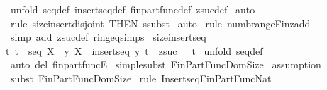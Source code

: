 \begin{isabellebody}
%
\isadelimproof
%
\endisadelimproof
%
\isatagproof
{}\isamarkupfalse%
\ {\isacharparenleft}unfold\ seq{\isacharunderscore}def\ insertseq{\isacharunderscore}def\ fin{\isacharunderscore}part{\isacharunderscore}func{\isacharunderscore}def\ zsuc{\isacharunderscore}def{\isacharparenright}\isanewline
{}\isamarkupfalse%
\ auto\isanewline
{}\isamarkupfalse%
\ {\isacharparenleft}rule\ size{\isacharunderscore}insert{\isacharunderscore}disjoint\ {\isacharbrackleft}THEN\ ssubst{\isacharbrackright}{\isacharparenright}\isanewline
{}\isamarkupfalse%
\ auto\isanewline
{}\isamarkupfalse%
\ {\isacharparenleft}rule\ numb{\isacharunderscore}range{\isacharunderscore}Fin{\isacharunderscore}zadd{\isacharparenright}\isanewline
{}\isamarkupfalse%
\ {\isacharparenleft}simp\ add{\isacharcolon}\ zsuc{\isacharunderscore}def\ ring{\isacharunderscore}eq{\isacharunderscore}simps{\isacharparenright}{\isacharplus}\isanewline
{}\isamarkupfalse%
%
\endisatagproof
{\isafoldproof}%
%
\isadelimproof
\isanewline
%
\endisadelimproof
\isanewline
\isanewline
{}\isamarkupfalse%
\ size{\isacharunderscore}insert{\isacharunderscore}seq{\isacharcolon}\ \isanewline
{\isachardoublequoteopen}{\isacharbang}{\isacharbang}t{\isachardot}\ {\isacharbrackleft}{\isacharbar}t\ {\isacharcolon}\ seq\ X\ {\isacharsemicolon}\ y{\isacharcolon}\ X{\isacharbar}{\isacharbrackright}\ {\isacharequal}{\isacharequal}{\isachargreater}\ {\isacharhash}{\isacharparenleft}insertseq\ y\ t{\isacharparenright}\ {\isacharequal}\ zsuc\ \ {\isacharparenleft}{\isacharhash}\ t{\isacharparenright}{\isachardoublequoteclose}\isanewline
%
\isadelimproof
%
\endisadelimproof
%
\isatagproof
{}\isamarkupfalse%
\ {\isacharparenleft}unfold\ seq{\isacharunderscore}def{\isacharparenright}\isanewline
{}\isamarkupfalse%
\ {\isacharparenleft}auto\ del{\isacharcolon}\ fin{\isacharunderscore}part{\isacharunderscore}funcE{\isacharparenright}\isanewline
{}\isamarkupfalse%
\ {\isacharparenleft}simplesubst\ Fin{\isacharunderscore}Part{\isacharunderscore}Func{\isacharunderscore}Dom{\isacharunderscore}Size{\isacharparenright}\isanewline
{}\isamarkupfalse%
\ assumption\isanewline
{}\isamarkupfalse%
\ {\isacharparenleft}subst\ Fin{\isacharunderscore}Part{\isacharunderscore}Func{\isacharunderscore}Dom{\isacharunderscore}Size{\isacharparenright}\isanewline
{}\isamarkupfalse%
\ {\isacharparenleft}rule\ Insertseq{\isacharunderscore}Fin{\isacharunderscore}Part{\isacharunderscore}Func{\isacharunderscore}Nat{\isacharparenright}\isanewline

\end{isabellebody}
